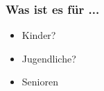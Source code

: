 \documentclass[12pt, table]{beamer}
\begin{document}
\begin{frame}
	\frametitle{Was ist es für ...}
	\begin{itemize}
		\item<1-> Kinder?
		\begin{center}
		\end{center}
		\item<3-> Jugendliche?
		\begin{center}
		\end{center}
		\item<5-> Senioren
		\begin{center}
\end{center}
\end{itemize}
\end{frame}
\end{document}
